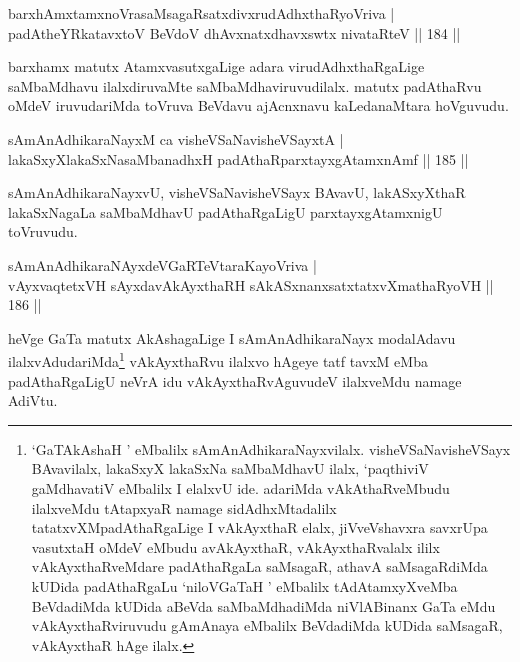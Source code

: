\begin{shl}
barxhAmxtamxnoVrasaMsagaRsatxdivxrudAdhxthaRyoVriva |\\
padAtheYRkatavxtoV BeVdoV dhAvxnatxdhavxswtx nivataRteV \hfill || 184 ||
\end{shl}

\begin{artha}
barxhamx matutx AtamxvasutxgaLige adara virudAdhxthaRgaLige saMbaMdhavu ilalxdiruvaMte saMbaMdhaviruvudilalx. matutx padAthaRvu oMdeV iruvudariMda toVruva BeVdavu ajAcnxnavu kaLedanaMtara hoVguvudu.
\end{artha}


\begin{shl}
sAmAnAdhikaraNayxM ca visheVSaNavisheVSayxtA |\\
lakaSxyXlakaSxNasaMbanadhxH padAthaRparxtayxgAtamxnAmf \hfill || 185 ||
\end{shl}

\begin{artha}
sAmAnAdhikaraNayxvU, visheVSaNavisheVSayx BAvavU, lakASxyXthaR lakaSxNagaLa saMbaMdhavU padAthaRgaLigU parxtayxgAtamxnigU toVruvudu.
\end{artha}


\begin{shl}
sAmAnAdhikaraNAyxdeVGaRTeVtaraKayoVriva |\\
vAyxvaqtetxVH sAyxdavAkAyxthaRH sAkASxnanxsatxtatxvXmathaRyoVH \hfill || 186 ||
\end{shl}

\begin{artha}
heVge GaTa matutx AkAshagaLige I sAmAnAdhikaraNayx modalAdavu ilalxvAdudariMda\footnote[1]{`GaTAkAshaH ' eMbalilx sAmAnAdhikaraNayxvilalx. visheVSaNavisheVSayx BAvavilalx, lakaSxyX lakaSxNa saMbaMdhavU ilalx, `paqthiviV gaMdhavatiV eMbalilx I elalxvU ide. adariMda vAkAthaRveMbudu ilalxveMdu tAtapxyaR namage sidAdhxMtadalilx tatatxvXMpadAthaRgaLige I vAkAyxthaR elalx, jiVveVshavxra savxrUpa vasutxtaH oMdeV eMbudu avAkAyxthaR, vAkAyxthaRvalalx ililx vAkAyxthaRveMdare padAthaRgaLa saMsagaR, athavA saMsagaRdiMda kUDida padAthaRgaLu `niloVGaTaH ' eMbalilx tAdAtamxyXveMba BeVdadiMda kUDida aBeVda saMbaMdhadiMda niVlABinanx GaTa eMdu vAkAyxthaRviruvudu gAmAnaya eMbalilx BeVdadiMda kUDida saMsagaR, vAkAyxthaR hAge ilalx.} vAkAyxthaRvu ilalxvo hAgeye tatf tavxM eMba padAthaRgaLigU neVrA idu vAkAyxthaRvAguvudeV ilalxveMdu namage AdiVtu.
\end{artha}

